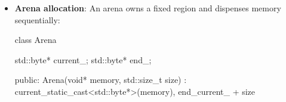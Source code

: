 \documentclass{report}
\begin{document}
\begin{itemize}
\begin{cppcode}
                std::array<Message, 16> message_pool;
            \end{cppcode}
            \bigbreak \noindent 
            A pool maintains a collection of equally sized slots. Allocation selects a free slot, and deallocation returns it.
            \begin{itemize}
                \item Fixed maximum memory usage
                \item No external fragmentation
                \item Usually constant or bounded allocation time
                \item Straightforward failure behavior
                \item Easier testing of exhaustion
            \end{itemize}
        \item \textbf{Arena allocation}: An arena owns a fixed region and dispenses memory sequentially:
            \bigbreak \noindent 
            \begin{cppcode}
                class Arena {
                    std::byte* current_;
                    std::byte* end_;

                    public:
                    Arena(void* memory, std::size_t size)
                        : current_{static_cast<std::byte*>(memory)},
                        end_{current_ + size} {}

}
\end{cppcode}
\end{itemize}
\end{document}
